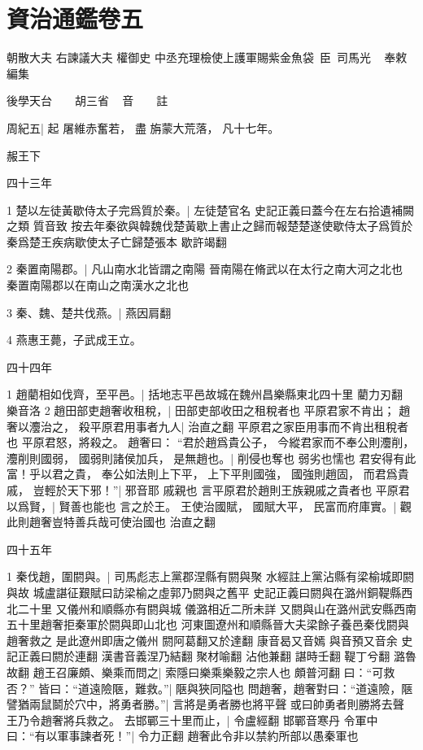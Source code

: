 \chapter{資治通鑑卷五}

\hfill {\large{}朝散大夫 右諫議大夫 權御史 中丞充理檢使上護軍賜紫金魚袋~臣~司馬光 ~ 奉敕編集}

\hfill {\large{}後學天台~　~胡三省 ~ 音　　註}

周紀五|{
	起 屠維赤奮若，
	盡 旃蒙大荒落，
	凡十七年。
	}


赧王下


四十三年


1 楚以左徒黃歇侍太子完{\kern 2pt}爲質於秦。|{
	左徒楚官名
	史記正義曰蓋今在左右拾遺補闕之類
	質音致
	按去年秦欲與韓魏伐楚黃歇上書止之歸而報楚楚遂使歇侍太子爲質於秦爲楚王疾病歇使太子亡歸楚張本
	歇許竭翻
	}

2 秦置南陽郡。|{
	凡山南水北皆謂之南陽
	晉南陽在脩武以在太行之南大河之北也
	秦置南陽郡以在南山之南漢水之北也}

3 秦、魏、楚共伐燕。|{
	燕因肩翻}

4 燕惠王薨，子武成王立。


四十四年

1 趙藺相如伐齊，至平邑。|{
	括地志平邑故城在魏州昌樂縣東北四十里
	藺力刃翻
	樂音洛
	}
2 趙田部吏趙奢收租稅，|{
	田部吏部收田之租稅者也}
平原君家不肯出；
趙奢以灋治之，
殺平原君用事者九人|{
	治直之翻
	平原君之家臣用事而不肯出租稅者也}
平原君怒，將殺之。
趙奢曰：
“君於趙爲貴公子，
今縱君家而不奉公則灋削，
灋削則國弱，
國弱則諸侯加兵，
是無趙也。|{
	削侵也奪也
	弱劣也懦也}
君安得有此富！乎以君之貴，
奉公如法則上下平，
上下平則國強，
國強則趙固，
而君爲貴戚，
豈輕於天下邪！”|{
	邪音耶
	戚親也
	言平原君於趙則王族親戚之貴者也}
平原君以爲賢，|{
	賢善也能也}
言之於王。
王使治國賦，
國賦大平，
民富而府庫實。|{
	觀此則趙奢豈特善兵哉可使治國也
	治直之翻
	}


四十五年

1 秦伐趙，圍閼與。|{
	司馬彪志上黨郡涅縣有閼與聚
	水經註上黨沾縣有梁榆城即閼與故
	城盧諶征艱賦曰訪梁榆之虛郭乃閼與之舊平
	史記正義曰閼與在潞州銅鞮縣西北二十里
	又儀州和順縣亦有閼與城
	儀潞相近二所未詳
	又閼與山在潞州武安縣西南五十里趙奢拒秦軍於閼與即山北也
	河東圖遼州和順縣晉大夫梁餘子養邑秦伐閼與趙奢救之
	是此遼州即唐之儀州
	閼阿葛翻又於達翻
	康音曷又音嫣
	與音預又音余
	史記正義曰閼於連翻
	漢書音義涅乃結翻
	聚材喻翻
	沾他兼翻
	諶時壬翻
	鞮丁兮翻
	潞魯故翻
	}
趙王召廉頗、樂乘而問之|{
	索隱曰樂乘樂毅之宗人也
	頗普河翻
	}
曰：“可救否？”
皆曰：“道遠險陿，難救。”|{
	陿與狹同隘也
	}
問趙奢，趙奢對曰：“道遠險，陿譬猶兩鼠鬬於穴中，將勇者勝。”|{
	言將是勇者勝也將平聲
	或曰帥勇者則勝將去聲
	}
王乃令趙奢將兵救之。
去邯鄲三十里而止，|{
	令盧經翻
	邯鄲音寒丹}
令軍中曰：“有以軍事諫者死！”|{
	令力正翻
	趙奢此令非以禁約所部以愚秦軍也}


